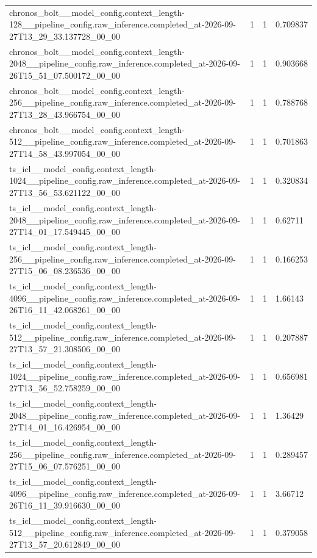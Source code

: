\begin{tabular}{llll}
chronos\_bolt\_\_model\_config.context\_length-128\_\_pipeline\_config.raw\_inference.completed\_at-2026-09-27T13\_29\_33.137728\_00\_00 & 1 & 1 & 0.709837 \\
chronos\_bolt\_\_model\_config.context\_length-2048\_\_pipeline\_config.raw\_inference.completed\_at-2026-09-26T15\_51\_07.500172\_00\_00 & 1 & 1 & 0.903668 \\
chronos\_bolt\_\_model\_config.context\_length-256\_\_pipeline\_config.raw\_inference.completed\_at-2026-09-27T13\_28\_43.966754\_00\_00 & 1 & 1 & 0.788768 \\
chronos\_bolt\_\_model\_config.context\_length-512\_\_pipeline\_config.raw\_inference.completed\_at-2026-09-27T14\_58\_43.997054\_00\_00 & 1 & 1 & 0.701863 \\
ts\_icl\_\_model\_config.context\_length-1024\_\_pipeline\_config.raw\_inference.completed\_at-2026-09-27T13\_56\_53.621122\_00\_00 & 1 & 1 & 0.320834 \\
ts\_icl\_\_model\_config.context\_length-2048\_\_pipeline\_config.raw\_inference.completed\_at-2026-09-27T14\_01\_17.549445\_00\_00 & 1 & 1 & 0.62711 \\
ts\_icl\_\_model\_config.context\_length-256\_\_pipeline\_config.raw\_inference.completed\_at-2026-09-27T15\_06\_08.236536\_00\_00 & 1 & 1 & 0.166253 \\
ts\_icl\_\_model\_config.context\_length-4096\_\_pipeline\_config.raw\_inference.completed\_at-2026-09-26T16\_11\_42.068261\_00\_00 & 1 & 1 & 1.66143 \\
ts\_icl\_\_model\_config.context\_length-512\_\_pipeline\_config.raw\_inference.completed\_at-2026-09-27T13\_57\_21.308506\_00\_00 & 1 & 1 & 0.207887 \\
ts\_icl\_\_model\_config.context\_length-1024\_\_pipeline\_config.raw\_inference.completed\_at-2026-09-27T13\_56\_52.758259\_00\_00 & 1 & 1 & 0.656981 \\
ts\_icl\_\_model\_config.context\_length-2048\_\_pipeline\_config.raw\_inference.completed\_at-2026-09-27T14\_01\_16.426954\_00\_00 & 1 & 1 & 1.36429 \\
ts\_icl\_\_model\_config.context\_length-256\_\_pipeline\_config.raw\_inference.completed\_at-2026-09-27T15\_06\_07.576251\_00\_00 & 1 & 1 & 0.289457 \\
ts\_icl\_\_model\_config.context\_length-4096\_\_pipeline\_config.raw\_inference.completed\_at-2026-09-26T16\_11\_39.916630\_00\_00 & 1 & 1 & 3.66712 \\
ts\_icl\_\_model\_config.context\_length-512\_\_pipeline\_config.raw\_inference.completed\_at-2026-09-27T13\_57\_20.612849\_00\_00 & 1 & 1 & 0.379058 \\

\end{tabular}
